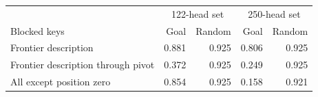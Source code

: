 \begin{tabular}{lrrrr}\toprule
 & \multicolumn{2}{c}{122-head set} & \multicolumn{2}{c}{250-head set}\\
Blocked keys & Goal & Random & Goal & Random\\\midrule
Frontier description & 0.881 & 0.925 & 0.806 & 0.925\\
Frontier description through pivot & 0.372 & 0.925 & 0.249 & 0.925\\
All except position zero & 0.854 & 0.925 & 0.158 & 0.921\\
\bottomrule\end{tabular}